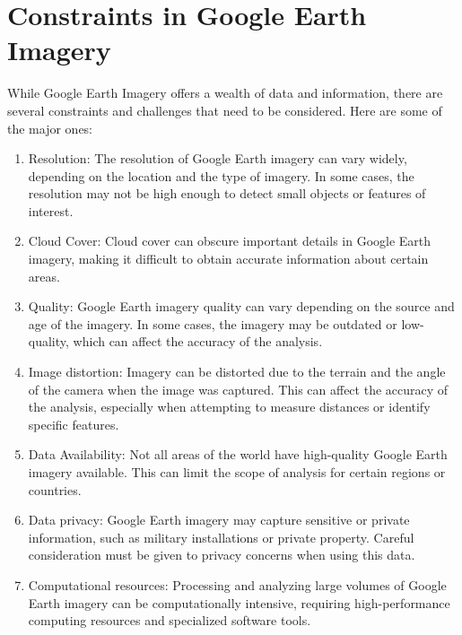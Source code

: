 \section{Constraints in Google Earth Imagery}
While Google Earth Imagery offers a wealth of data and information, there are several constraints and challenges that need to be considered. Here are some of the major ones:
\begin{enumerate}
    \item Resolution: The resolution of Google Earth imagery can vary widely, depending on the location and the type of imagery. In some cases, the resolution may not be high enough to detect small objects or features of interest.
    \item Cloud Cover: Cloud cover can obscure important details in Google Earth imagery, making it difficult to obtain accurate information about certain areas.
    \item Quality: Google Earth imagery quality can vary depending on the source and age of the imagery. In some cases, the imagery may be outdated or low-quality, which can affect the accuracy of the analysis.
    \item Image distortion: Imagery can be distorted due to the terrain and the angle of the camera when the image was captured. This can affect the accuracy of the analysis, especially when attempting to measure distances or identify specific features.
    \item Data Availability: Not all areas of the world have high-quality Google Earth imagery available. This can limit the scope of analysis for certain regions or countries.
    \item Data privacy: Google Earth imagery may capture sensitive or private information, such as military installations or private property. Careful consideration must be given to privacy concerns when using this data.
    \item Computational resources: Processing and analyzing large volumes of Google Earth imagery can be computationally intensive, requiring high-performance computing resources and specialized software tools.
\end{enumerate}
